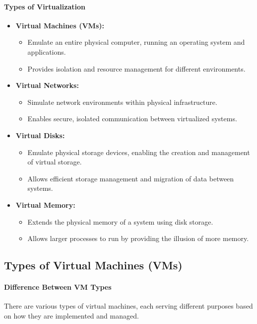 \documentclass{article}
\begin{document}
\paragraph{Types of Virtualization}
\begin{itemize}
    \item \textbf{Virtual Machines (VMs):} 
    \begin{itemize}
        \item Emulate an entire physical computer, running an operating system and applications.
        \item Provides isolation and resource management for different environments.
    \end{itemize}
    
    \item \textbf{Virtual Networks:} 
    \begin{itemize}
        \item Simulate network environments within physical infrastructure.
        \item Enables secure, isolated communication between virtualized systems.
    \end{itemize}

    \item \textbf{Virtual Disks:} 
    \begin{itemize}
        \item Emulate physical storage devices, enabling the creation and management of virtual storage.
        \item Allows efficient storage management and migration of data between systems.
    \end{itemize}

    \item \textbf{Virtual Memory:} 
    \begin{itemize}
        \item Extends the physical memory of a system using disk storage.
        \item Allows larger processes to run by providing the illusion of more memory.
    \end{itemize}
\end{itemize}

\subsection{Types of Virtual Machines (VMs)}

\paragraph{Difference Between VM Types}
There are various types of virtual machines, each serving different purposes based on how they are implemented and managed.
\end{document}
